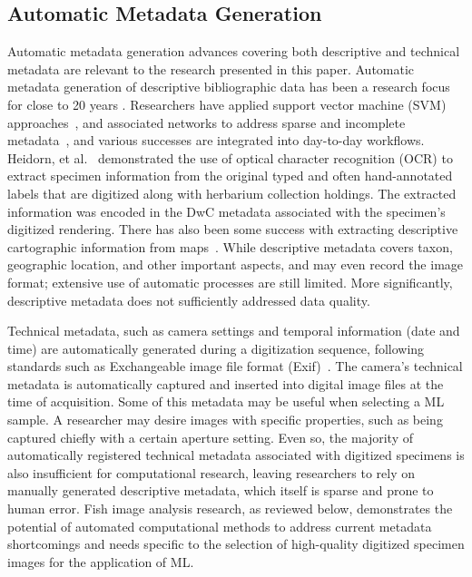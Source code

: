 \documentclass[conference]{IEEEtran}
\begin{document}
\subsection{Automatic Metadata Generation}
Automatic metadata generation advances covering both descriptive and technical metadata are relevant to the research presented in this paper. Automatic metadata generation of descriptive bibliographic data has been a research focus for close to 20 years \cite{liddy2002automatic,greenberg2004metadata,cardinaels2005automating,paynter2005developing}. Researchers have applied support vector machine (SVM) approaches~\cite{han2003automatic}, and associated networks to address sparse and incomplete metadata~\cite{rodriguez2009automatic}, and various successes are integrated into day-to-day workflows. Heidorn, et al.~\cite{heidorn2008automatic} demonstrated the use of optical character recognition (OCR) to extract specimen information from the original typed and often hand-annotated labels that are digitized along with herbarium collection holdings. The extracted information was encoded in the DwC metadata associated with the specimen's digitized rendering. There has also been some success with extracting descriptive cartographic information from maps~\cite{manso2004automatic}. While descriptive metadata covers taxon, geographic location, and other important aspects, and may even record the image format; extensive use of automatic processes are still limited. More significantly, descriptive metadata does not sufficiently addressed data quality.

Technical metadata, such as camera settings and temporal information (date and time) are automatically generated during a digitization sequence, following standards such as Exchangeable image file format (Exif)~\cite{Exif}. The camera's technical metadata is automatically captured and inserted into digital image files at the time of acquisition. Some of this metadata may be useful when selecting a ML sample. A researcher may desire images with specific properties, such as being captured chiefly with a certain aperture setting. Even so, the majority of automatically registered technical metadata associated with digitized specimens is also insufficient for computational research, leaving researchers to rely on manually generated descriptive metadata, which itself is sparse and prone to human error.
Fish image analysis research, as reviewed below, demonstrates the
potential of automated computational methods to address current metadata shortcomings and needs specific to the selection of high-quality digitized specimen images for the application of ML.
\end{document}
